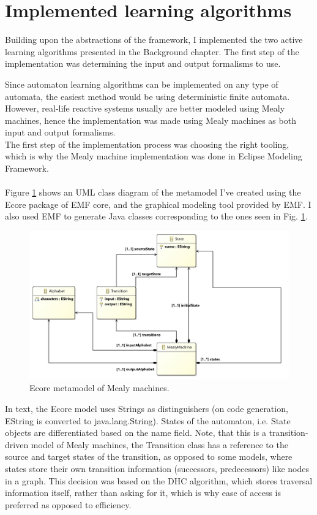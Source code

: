 \section{Implemented learning algorithms}

Building upon the abstractions of the framework, I implemented the two active learning algorithms presented in the Background chapter. The first step of the implementation was determining the input and output formalisms to use.

Since automaton learning algorithms can be implemented on any type of automata, the easiest method would be using deterministic finite automata. However, real-life reactive systems usually are better modeled using Mealy machines, hence the implementation was made using Mealy machines as both input and output formalisms.
\\
The first step of the implementation process was choosing the right tooling, which is why the Mealy machine implementation was done in Eclipse Modeling Framework.
\\\\
Figure \ref*{fig:mealyecore} shows an UML class diagram of the metamodel I've created using the Ecore package of EMF core, and the graphical modeling tool provided by EMF. I also used EMF to generate Java classes corresponding to the ones seen in Fig. \ref*{fig:mealyecore}.

\begin{figure}
	\centering
	\includegraphics[width=1.0\linewidth]{figures/mealymodel}
	\caption{Ecore metamodel of Mealy machines.}
	\label{fig:mealyecore}
\end{figure}

In text, the Ecore model uses Strings as distinguishers (on code generation, EString is converted to java.lang.String). States of the automaton, i.e. State objects are differentiated based on the name field. Note, that this is a transition-driven model of Mealy machines, the Transition class has a reference to the source and target states of the transition, as opposed to some models, where states store their own transition information (successors, predecessors) like nodes in a graph. This decision was based on the DHC algorithm, which stores traversal information itself, rather than asking for it, which is why ease of access is preferred as opposed to efficiency.

